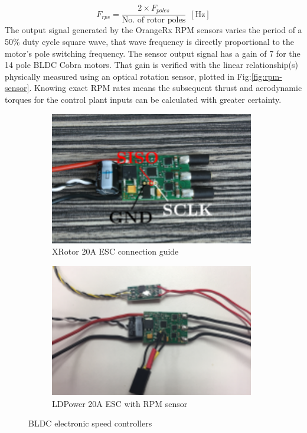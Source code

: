 \begin{equation}
F_{rps}=\frac{2\times F_{poles}}{\text{No. of rotor poles}}~~[\text{Hz}]
\end{equation}
The output signal generated by the OrangeRx RPM sensors varies the period of a 50\% duty cycle square wave, that wave frequency is directly proportional to the motor's pole switching frequency. The sensor output signal has a gain of 7 for the 14 pole BLDC Cobra motors. That gain is verified with the linear relationship(s) physically measured using an optical rotation sensor, plotted in Fig:\ref{fig:rpm-sensor}. Knowing exact RPM rates means the subsequent thrust and aerodynamic torques for the control plant inputs can be calculated with greater certainty.
\par
\begin{figure}[hbtp]
\begin{subfigure}{0.5\textwidth}
\centering
\includegraphics[width=0.98\textwidth]{figs/xrotor-20A}
\caption{XRotor 20A ESC connection guide\cite{xrotor}}
\label{fig:xrotor-20A}
\end{subfigure}
\begin{subfigure}{0.5\textwidth}
\centering
\includegraphics[width=0.98\textwidth]{figs/ldpower-20A}
\caption{LDPower 20A ESC with RPM sensor}
\label{fig:ldpower-20A}
\end{subfigure}
\caption{BLDC electronic speed controllers}
\vspace{-6pt}
\end{figure}
